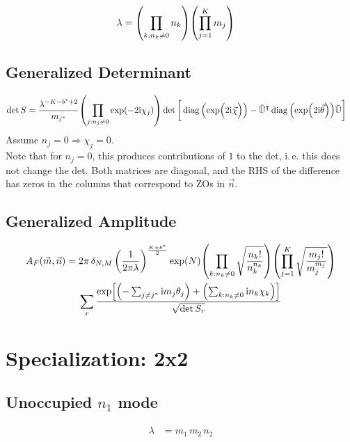 \documentclass[
	english,
	a4paper,
	fontsize=10pt,
	parskip=half,
	titlepage=true,
	DIV=12,
	final
]{scrreprt}
\newcommand*{\ie}{i.\,e.\xspace}
\newcommand*{\Thus}{\ensuremath{\Rightarrow}\xspace}
\newcommand*{\transp}{\ensuremath{^\intercal}}
\newcommand*{\iunit}{\ensuremath{\mathrm{i}}}
\DeclareMathOperator{\diag}{diag}
\begin{document}
\begin{align}
	\lambda
&=
	\qty( \prod_{k : n_k \neq 0} n_k )
	\qty( \prod_{j = 1}^{K}      m_j )
\label{eqn:DefLambdaGeneric_n}
\end{align}

\subsection{Generalized Determinant}
\begin{align}
	\det S
&=
	\frac{ \lambda^{-K - b^* + 2} }{ m_{j^*} }
	\qty( \prod_{j: n_j \neq 0} \exp(-2\iunit \chi_j) )
	\det\qty[\bigg.
		\diag\qty(\exp(\Big.2\iunit\vec{\chi}))
		-
		\tilde{\mathbb{U}}\transp
		\diag\qty(\exp(2\iunit\vec{\theta}))
		\tilde{\mathbb{U}}
	]
\label{eqn:detSGeneralized_n}
\end{align}
Assume $n_j = 0 \Thus \chi_j = 0$.\\

Note that for $n_j = 0$, this produces contributions of $1$ to the det, \ie this does not change the det. Both matrices are diagonal, and the RHS of the difference has zeros in the columns that correspond to ZOs in $\vec{n}$.

\subsection{Generalized Amplitude}
\begin{multline}
	A_F(\vec{m}, \vec{n})
=
	2\pi \, \delta_{N,M} \, \qty(
		\frac{1}{2\pi\lambda}
	)^{\frac{K + b^*}{2}}
	\exp(N)
	\qty( \prod_{k : n_k \neq 0}
		\sqrt{\frac
			{ n_k! }
			{ n_k^{n_k} }
	})
	\qty( \prod_{j = 1}^{K}
		\sqrt{\frac
			{ m_j! }
			{ m_j^{m_j} }
	})
\\
	\sum_r
		\frac
		{\exp[
			\qty(- \sum_{j\neq j^*}      \iunit m_j \theta_j) + 
			\qty(  \sum_{k : n_k \neq 0} \iunit n_k \chi  _k)
		]}
		{\sqrt{\det S_r}}
\end{multline}

\section{Specialization: 2x2}
\subsection{Unoccupied $n_1$ mode}
\begin{align}
	\lambda
&=
	m_1 \, m_2 \, n_2
\end{align}
\end{document}
